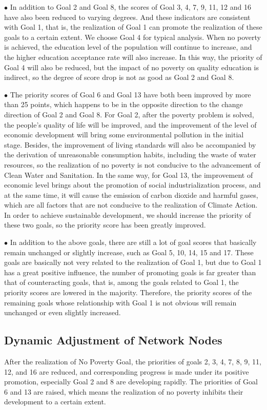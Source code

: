 \documentclass[12pt]{article}  %
\begin{document}
$\bullet$ In addition to Goal 2 and Goal 8, the scores of Goal 3, 4, 7, 9, 11,  12 and 16 have also been reduced to varying degrees. And these indicators are consistent with Goal 1, that is, the realization of Goal 1 can promote the realization of these goals to a certain extent. We choose Goal 4 for typical analysis. When no poverty is achieved, the education level of the population will continue to increase, and the higher education acceptance rate will also increase. In this way, the priority of Goal 4 will also be reduced, but the impact of no poverty on quality education is indirect, so the degree of score drop is not as good as Goal 2 and Goal 8.

$\bullet$ The priority scores of Goal 6 and Goal 13 have both been improved by more than 25 points, which happens to be in the opposite direction to the change direction of Goal 2 and Goal 8. For Goal 2, after the poverty problem is solved, the people's quality of life will be improved, and the improvement of the level of economic development will bring some environmental pollution in the initial stage. Besides, the improvement of living standards will also be accompanied by the derivation of unreasonable consumption habits, including the waste of water resources, so the realization of no poverty is not conducive to the advancement of Clean Water and Sanitation. In the same way, for Goal 13, the improvement of economic level brings about the promotion of social industrialization process, and at the same time, it will cause the emission of carbon dioxide and harmful gases, which are all factors that are not conducive to the realization of Climate Action. In order to achieve sustainable development, we should increase the priority of these two goals, so the priority score has been greatly improved.

$\bullet$
In addition to the above goals, there are still a lot of goal scores that basically remain unchanged or slightly increase, such as Goal 5, 10, 14, 15 and 17. These goals are basically not very related to the realization of Goal 1, but due to Goal 1 has a great positive influence, the number of promoting goals is far greater than that of counteracting goals, that is, among the goals related to Goal 1, the priority scores are lowered in the majority. Therefore, the priority scores of the remaining goals whose relationship with Goal 1 is not obvious will remain unchanged or even slightly increased.
\subsection{Dynamic Adjustment of Network Nodes}
After the realization of No Poverty Goal, the priorities of goals 2, 3, 4, 7, 8, 9, 11, 12, and 16 are reduced, and corresponding progress is made under its positive promotion, especially Goal 2 and 8 are developing rapidly. The priorities of Goal 6 and 13 are raised, which means the realization of no poverty inhibits their development to a certain extent.
\end{document}
